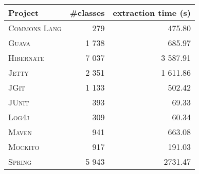 \begin{tabularx}{0.8\textwidth}{l R R}
\toprule
\textbf{Project} & \textbf{\#classes} & \textbf{extraction time (s)} \\
\midrule
\textsc{Commons Lang} & 279 & 475.80 \\
\textsc{Guava} & 1 738 & 685.97 \\
\textsc{Hibernate} & 7 037 & 3 587.91 \\
\textsc{Jetty} & 2 351 & 1 611.86 \\
\textsc{JGit} & 1 133 & 502.42 \\
\textsc{JUnit} & 393 & 69.33 \\
\textsc{Log4j} & 309 & 60.34 \\
\textsc{Maven} & 941 & 663.08 \\
\textsc{Mockito} & 917 & 191.03 \\
\textsc{Spring} & 5 943 & 2731.47 \\
\bottomrule
\end{tabularx}